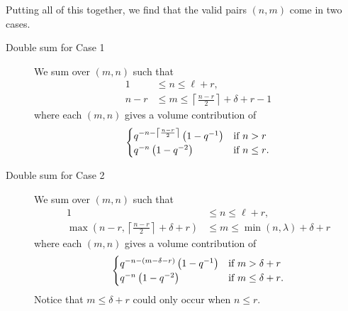 Putting all of this together, we find that the valid pairs $(n,m)$ come in two cases.

\begin{description}
\item[Double sum for Case 1]
We sum over $(m,n)$ such that
\begin{equation}
  \begin{aligned}
    1 &\leq n \leq \ell + r, \\
    n-r &\leq m \leq \left\lceil \frac{n-r}{2} \right\rceil+\delta+r - 1
  \end{aligned}
  \label{eq:odd_range1}
\end{equation}
where each $(m,n)$ gives a volume contribution of
\begin{equation}
  \begin{cases}
    q^{-n - \left\lceil \frac{n-r}{2} \right\rceil} \left( 1 - q^{-1} \right)
      & \text{if $n > r$} \\
    q^{-n} \left( 1 - q^{-2} \right)
      & \text{if $n \leq r$}.
  \end{cases}
  \label{eq:case_1_vol_contrib}
\end{equation}

\item[Double sum for Case 2]
We sum over $(m,n)$ such that
\begin{equation}
  \begin{aligned}
    1 &\leq n \leq \ell + r, \\
    \max\left(n-r, \left\lceil \frac{n-r}{2} \right\rceil+\delta+r \right)
    &\leq m \leq \min(n,\lambda)+\delta+r
  \end{aligned}
  \label{eq:odd_range2}
\end{equation}
where each $(m,n)$ gives a volume contribution of
\begin{equation}
  \begin{cases}
    q^{-n - (m-\delta-r)} \left( 1 - q^{-1} \right)
      & \text{if $m > \delta + r$} \\
    q^{-n} \left( 1 - q^{-2} \right)
      & \text{if $m \le \delta + r$}.
  \end{cases}
  \label{eq:case_2_vol_contrib}
\end{equation}
Notice that $m \leq \delta + r$ could only occur when $n \leq r$.
\end{description}


